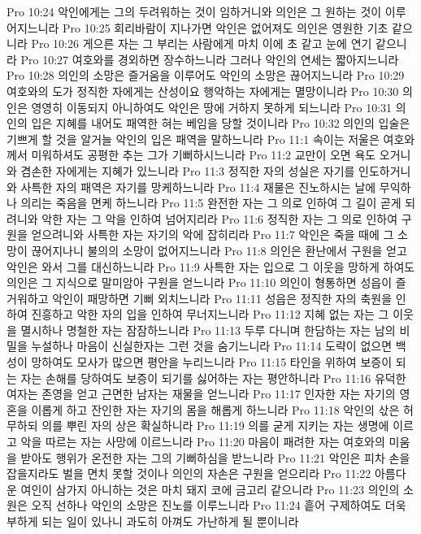 Pro 10:24  악인에게는 그의 두려워하는 것이 임하거니와 의인은 그 원하는 것이 이루어지느니라
Pro 10:25  회리바람이 지나가면 악인은 없어져도 의인은 영원한 기초 같으니라
Pro 10:26  게으른 자는 그 부리는 사람에게 마치 이에 초 같고 눈에 연기 같으니라
Pro 10:27  여호와를 경외하면 장수하느니라 그러나 악인의 연세는 짧아지느니라
Pro 10:28  의인의 소망은 즐거움을 이루어도 악인의 소망은 끊어지느니라
Pro 10:29  여호와의 도가 정직한 자에게는 산성이요 행악하는 자에게는 멸망이니라
Pro 10:30  의인은 영영히 이동되지 아니하여도 악인은 땅에 거하지 못하게 되느니라
Pro 10:31  의인의 입은 지혜를 내어도 패역한 혀는 베임을 당할 것이니라
Pro 10:32  의인의 입술은 기쁘게 할 것을 알거늘 악인의 입은 패역을 말하느니라
Pro 11:1  속이는 저울은 여호와께서 미워하셔도 공평한 추는 그가 기뻐하시느니라
Pro 11:2  교만이 오면 욕도 오거니와 겸손한 자에게는 지혜가 있느니라
Pro 11:3  정직한 자의 성실은 자기를 인도하거니와 사특한 자의 패역은 자기를 망케하느니라
Pro 11:4  재물은 진노하시는 날에 무익하나 의리는 죽음을 면케 하느니라
Pro 11:5  완전한 자는 그 의로 인하여 그 길이 곧게 되려니와 악한 자는 그 악을 인하여 넘어지리라
Pro 11:6  정직한 자는 그 의로 인하여 구원을 얻으려니와 사특한 자는 자기의 악에 잡히리라
Pro 11:7  악인은 죽을 때에 그 소망이 끊어지나니 불의의 소망이 없어지느니라
Pro 11:8  의인은 환난에서 구원을 얻고 악인은 와서 그를 대신하느니라
Pro 11:9  사특한 자는 입으로 그 이웃을 망하게 하여도 의인은 그 지식으로 말미암아 구원을 얻느니라
Pro 11:10  의인이 형통하면 성읍이 즐거워하고 악인이 패망하면 기뻐 외치느니라
Pro 11:11  성읍은 정직한 자의 축원을 인하여 진흥하고 악한 자의 입을 인하여 무너지느니라
Pro 11:12  지혜 없는 자는 그 이웃을 멸시하나 명철한 자는 잠잠하느니라
Pro 11:13  두루 다니며 한담하는 자는 남의 비밀을 누설하나 마음이 신실한자는 그런 것을 숨기느니라
Pro 11:14  도략이 없으면 백성이 망하여도 모사가 많으면 평안을 누리느니라
Pro 11:15  타인을 위하여 보증이 되는 자는 손해를 당하여도 보증이 되기를 싫어하는 자는 평안하니라
Pro 11:16  유덕한 여자는 존영을 얻고 근면한 남자는 재물을 얻느니라
Pro 11:17  인자한 자는 자기의 영혼을 이롭게 하고 잔인한 자는 자기의 몸을 해롭게 하느니라
Pro 11:18  악인의 삯은 허무하되 의를 뿌린 자의 상은 확실하니라
Pro 11:19  의를 굳게 지키는 자는 생명에 이르고 악을 따르는 자는 사망에 이르느니라
Pro 11:20  마음이 패려한 자는 여호와의 미움을 받아도 행위가 온전한 자는 그의 기뻐하심을 받느니라
Pro 11:21  악인은 피차 손을 잡을지라도 벌을 면치 못할 것이나 의인의 자손은 구원을 얻으리라
Pro 11:22  아름다운 여인이 삼가지 아니하는 것은 마치 돼지 코에 금고리 같으니라
Pro 11:23  의인의 소원은 오직 선하나 악인의 소망은 진노를 이루느니라
Pro 11:24  흩어 구제하여도 더욱 부하게 되는 일이 있나니 과도히 아껴도 가난하게 될 뿐이니라
